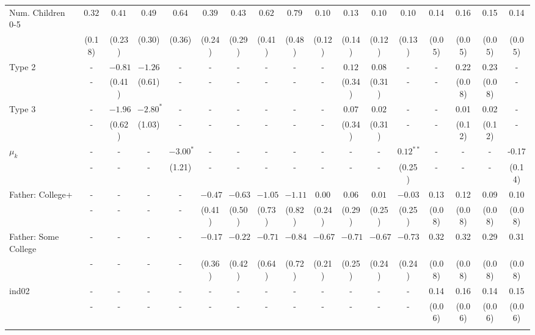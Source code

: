 \begin{tabular}{lcccccccccccccccc}
Num. Children 0-5&$0.32$&$0.41$&$0.49$&$0.64$&$0.39$&$0.43$&$0.62$&$0.79$&$0.10$&$0.13$&$0.10$&$0.10$&0.14&0.16&0.15&0.14\\
&(0.18)&(0.23)&(0.30)&(0.36)&(0.24)&(0.29)&(0.41)&(0.48)&(0.12)&(0.14)&(0.12)&(0.13)&(0.05)&(0.05)&(0.05)&(0.05)\\
Type 2&-&$-0.81$&$-1.26$&-&-&-&-&-&-&$0.12$&$0.08$&-&-&0.22&0.23&-\\
&-&(0.41)&(0.61)&-&-&-&-&-&-&(0.34)&(0.31)&-&-&(0.08)&(0.08)&-\\
Type 3&-&$-1.96$&$-2.80^{*}$&-&-&-&-&-&-&$0.07$&$0.02$&-&-&0.01&0.02&-\\
&-&(0.62)&(1.03)&-&-&-&-&-&-&(0.34)&(0.31)&-&-&(0.12)&(0.12)&-\\
$\mu_{k}$&-&-&-&$-3.00^{*}$&-&-&-&-&-&-&-&$0.12^{**}$&-&-&-&-0.17\\
&-&-&-&(1.21)&-&-&-&-&-&-&-&(0.25)&-&-&-&(0.14)\\
Father: College+&-&-&-&-&$-0.47$&$-0.63$&$-1.05$&$-1.11$&$0.00$&$0.06$&$0.01$&$-0.03$&0.13&0.12&0.09&0.10\\
&-&-&-&-&(0.41)&(0.50)&(0.73)&(0.82)&(0.24)&(0.29)&(0.25)&(0.25)&(0.08)&(0.08)&(0.08)&(0.08)\\
Father: Some College&-&-&-&-&$-0.17$&$-0.22$&$-0.71$&$-0.84$&$-0.67$&$-0.71$&$-0.67$&$-0.73$&0.32&0.32&0.29&0.31\\
&-&-&-&-&(0.36)&(0.42)&(0.64)&(0.72)&(0.21)&(0.25)&(0.24)&(0.24)&(0.08)&(0.08)&(0.08)&(0.08)\\
ind02&-&-&-&-&-&-&-&-&-&-&-&-&0.14&0.16&0.14&0.15\\
&-&-&-&-&-&-&-&-&-&-&-&-&(0.06)&(0.06)&(0.06)&(0.06)\\
\\
\bottomrule\end{tabular}